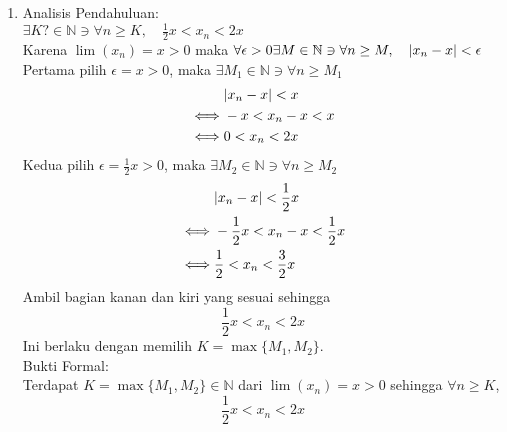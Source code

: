 \documentclass{article}
\begin{document}
\begin{enumerate}[leftmargin=*, label={\arabic*}.]
\item
Analisis Pendahuluan:\\
$\exists K?\in \mathbb{N} \ni \forall n \geq K, \quad \frac{1}{2}x < x_n < 2x$\\
Karena $\lim(x_n) = x > 0$ maka $\forall \epsilon > 0 \exists M \in \mathbb{N} \ni \forall n \geq M,\quad \lvert x_n-x\rvert < \epsilon$\\
Pertama pilih $\epsilon = x > 0$, maka $\exists M_1 \in \mathbb{N} \ni \forall n \geq M_1$
\begin{align*}
    &{\lvert x_n-x\rvert < x}\\
    \iff&-x < x_n-x < x\\
    \iff&0 < x_n < 2x\\
\end{align*}
Kedua pilih $\epsilon = \frac{1}{2}x > 0$, maka $\exists M_2 \in \mathbb{N} \ni \forall n \geq M_2$
\begin{align*}
    &{\lvert x_n-x\rvert < \frac{1}{2}x}\\
    \iff&-\frac{1}{2}x < x_n-x < \frac{1}{2}x\\
    \iff&\frac{1}{2}< x_n < \frac{3}{2}x\\
\end{align*}
Ambil bagian kanan dan kiri yang sesuai sehingga
\[
\frac{1}{2}x < x_n < 2x
\]
Ini berlaku dengan memilih $K = \max\{M_1,M_2\}$.\\
Bukti Formal:\\
Terdapat $K = \max\{M_1,M_2\} \in \mathbb{N}$ dari $\lim(x_n)=x > 0$ sehingga $\forall n \geq K$,
\[
    \frac{1}{2}x < x_n < 2x
\]
\end{enumerate}
\end{document}
